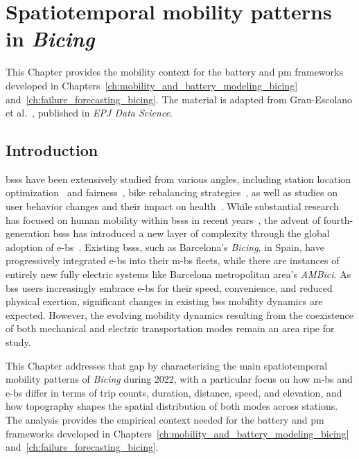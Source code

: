 \chapter{Spatiotemporal mobility patterns in \textit{Bicing}} \label{ch:bicing_mobility_patterns}

This Chapter provides the mobility context for the battery and \ac{pm} frameworks developed in Chapters~\ref{ch:mobility_and_battery_modeling_bicing} and~\ref{ch:failure_forecasting_bicing}. The material is adapted from Grau-Escolano et al.~\cite{Grau-Escolano2024}, published in \textit{EPJ Data Science}.

\section{Introduction}

\acp{bss} have been extensively studied from various angles, including station location optimization~\cite{Liu2015} and fairness~\cite{DuranRodas2020}, bike rebalancing strategies~\cite{Chardon2016}, as well as studies on user behavior changes and their impact on health~\cite{Ma2020, Qiu2018}. While substantial research has focused on human mobility within \acp{bss} in recent years~\cite{Talavera_Garcia2021, Kon2021}, the advent of fourth-generation \acp{bss} has introduced a new layer of complexity through the global adoption of \acp{e-b}~\cite{Shaheen2010, MeddinWorldMapReport2022}. Existing \acp{bss}, such as Barcelona's \textit{Bicing}, in Spain, have progressively integrated \acp{e-b} into their \acp{m-b} fleets, while there are instances of entirely new fully electric systems like Barcelona metropolitan area's \textit{AMBici}. As \ac{bss} users increasingly embrace \acp{e-b} for their speed, convenience, and reduced physical exertion, significant changes in existing \ac{bss} mobility dynamics are expected. However, the evolving mobility dynamics resulting from the coexistence of both mechanical and electric transportation modes remain an area ripe for study.

This Chapter addresses that gap by characterising the main spatiotemporal mobility patterns of \textit{Bicing} during 2022, with a particular focus on how \acp{m-b} and \acp{e-b} differ in terms of trip counts, duration, distance, speed, and elevation, and how topography shapes the spatial distribution of both modes across stations. The analysis provides the empirical context needed for the battery and \ac{pm} frameworks developed in Chapters~\ref{ch:mobility_and_battery_modeling_bicing} and~\ref{ch:failure_forecasting_bicing}.

